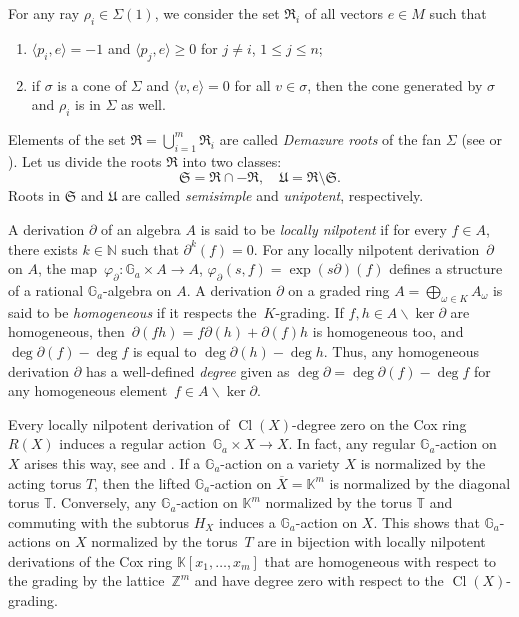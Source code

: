\documentclass[a4paper,reqno,12pt]{amsart}
\DeclareMathOperator {\Ker}{ker}
\DeclareMathOperator {\Cl}{Cl}
\def\N  {\mathbb N}
\def\Z  {\mathbb Z}
\def\Ga  {\mathbb G_a}
\def\K  {\mathbb K}
\theoremstyle{definition}
\begin{document}
For any ray $\rho_i\in \Sigma(1)$, we consider the set $\mathfrak R_i$ of all vectors $e \in M$ such that
\begin{enumerate}
\item $\langle p_i, e\rangle=-1$ and $\langle p_j, e \rangle \geq 0$ for $j \neq i$, $1 \leq j \leq n$;
\item if  $\sigma$ is a cone of $\Sigma$ and $\langle v, e \rangle=0$ for all $v \in \sigma$, then the cone generated by $\sigma$ and $\rho_i$ is in $\Sigma$ as well.
\end{enumerate}

Elements of the set $\mathfrak R = \bigcup\limits_{i=1}^m \mathfrak R_i$ are called \emph{Demazure roots} of the fan $\Sigma$ (see \cite[Section~3.1]{De} or \cite[Section~3.4]{Oda}).
Let us divide the roots $\mathfrak R$ into two classes:
\begin{equation*}
\mathfrak S = \mathfrak R \cap -\mathfrak R,\quad \mathfrak U = \mathfrak R \setminus \mathfrak S.
\end{equation*}
Roots in $\mathfrak{S}$ and $\mathfrak{U}$ are called \emph{semisimple} and \emph{unipotent}, respectively.
\smallskip

A derivation $\partial$ of an algebra $A$ is said to be \emph{locally nilpotent} if for every $f\in A$, there exists $k\in\N$ such that $\partial^k(f) = 0$.
For any locally nilpotent derivation~$\partial$ on $A$, the map~${\varphi_{\partial}:\Ga\times A\rightarrow A}$, ${\varphi_{\partial}(s,f)=\exp(s\partial)(f)}$ defines a
structure of a rational $\Ga$-algebra on $A$. A derivation $\partial$ on a graded ring $A = \bigoplus\limits_{\omega \in K} A_{\omega}$ is said to be \emph{homogeneous} if it respects the~$K$-grading. If ${f,h\in A\backslash \Ker\partial}$ are homogeneous, then~${\partial(fh)=f\partial(h)+\partial(f)h}$ is homogeneous too, and ${\deg\partial(f)-\deg f}$ is equal to ${\deg\partial(h)-\deg h}$.
Thus, any homogeneous derivation $\partial$ has a well-defined \emph{degree} given
as $\deg\partial=\deg\partial(f)-\deg f$ for any homogeneous element~${f\in A\backslash \Ker\partial}$.


Every locally nilpotent derivation of $\Cl(X)$-degree zero on the Cox ring $R(X)$ induces a regular action~$\Ga\times X\to X$. In fact, any regular $\Ga$-action on $X$ arises this way, see \cite[Section~4]{Cox} and \cite[Theorem~4.2.3.2]{ADHL}.
If a $\Ga$-action on a variety $X$ is normalized by the acting torus $T$, then the lifted
$\Ga$-action on $\overline{X}=\K^m$ is normalized by the diagonal torus $\mathbb{T}$. Conversely,
any $\Ga$-action on $\K^m$ normalized by the torus $\mathbb T$ and commuting
with the subtorus $H_{X}$ induces a $\Ga$-action on $X$. This shows that $\Ga$-actions on $X$
normalized by the torus~$T$ are in bijection with locally nilpotent derivations of the Cox ring
$\K[x_1,\ldots,x_m]$ that are homogeneous with respect to the grading by the lattice~$\Z^m$ and have degree zero with respect to the $\Cl(X)$-grading.
\end{document}

